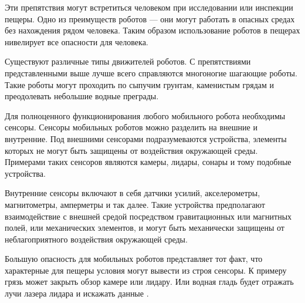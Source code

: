 Эти препятствия могут встретиться человеком при исследовании или инспекции пещеры. Одно из преимуществ роботов --- они могут работать в опасных средах без нахождения рядом человека. Таким образом использование роботов в пещерах нивелирует все опасности для человека.

Существуют различные типы движителей роботов. С препятствиями представленными выше лучше всего справляются многоногие шагающие роботы. Такие роботы могут проходить по сыпучим грунтам, каменистым грядам и преодолевать небольшие водные преграды.

Для полноценного функционирования любого мобильного робота необходимы сенсоры. Сенсоры мобильных роботов можно разделить на внешние и внутренние. Под внешними сенсорами подразумеваются устройства, элементы которых не могут быть защищены от воздействия окружающей среды. Примерами таких сенсоров являются камеры, лидары, сонары и тому подобные устройства.

Внутренние сенсоры включают в себя датчики усилий, акселерометры, магнитометры, амперметры и так далее. Такие устройства предполагают взаимодействие с внешней средой посредством гравитационных или магнитных полей, или механических элементов, и могут быть механически защищены от неблагоприятного воздействия окружающей среды.

Большую опасность для мобильных роботов представляет тот факт, что характерные для пещеры условия могут вывести из строя сенсоры. К примеру грязь  может закрыть обзор камере или лидару. Или водная гладь  будет отражать лучи лазера лидара и искажать данные .

